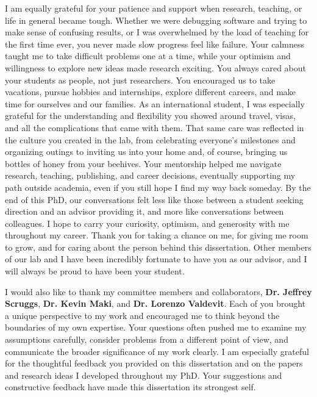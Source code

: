 I am equally grateful for your patience and support when research, teaching, or life in general became tough. Whether we were debugging software and trying to make sense of confusing results, or I was overwhelmed by the load of teaching for the first time ever, you never made slow progress feel like failure. Your calmness taught me to take difficult problems one at a time, while your optimism and willingness to explore new ideas made research exciting. You always cared about your students as people, not just researchers. You encouraged us to take vacations, pursue hobbies and internships, explore different careers, and make time for ourselves and our families. As an international student, I was especially grateful for the understanding and flexibility you showed around travel, visas, and all the complications that came with them. That same care was reflected in the culture you created in the lab, from celebrating everyone's milestones and organizing outings to inviting us into your home and, of course, bringing us bottles of honey from your beehives. Your mentorship helped me navigate research, teaching, publishing, and career decisions, eventually supporting my path outside academia, even if you still hope I find my way back someday. By the end of this PhD, our conversations felt less like those between a student seeking direction and an advisor providing it, and more like conversations between colleagues. I hope to carry your curiosity, optimism, and generosity with me throughout my career. Thank you for taking a chance on me, for giving me room to grow, and for caring about the person behind this dissertation. Other members of our lab and I have been incredibly fortunate to have you as our advisor, and I will always be proud to have been your student.

I would also like to thank my committee members and collaborators, \textbf{Dr. Jeffrey Scruggs}, \textbf{Dr. Kevin Maki}, and \textbf{Dr. Lorenzo Valdevit}. Each of you brought a unique perspective to my work and encouraged me to think beyond the boundaries of my own expertise. Your questions often pushed me to examine my assumptions carefully, consider problems from a different point of view, and communicate the broader significance of my work clearly. I am especially grateful for the thoughtful feedback you provided on this dissertation and on the papers and research ideas I developed throughout my PhD. Your suggestions and constructive feedback have made this dissertation its strongest self.

